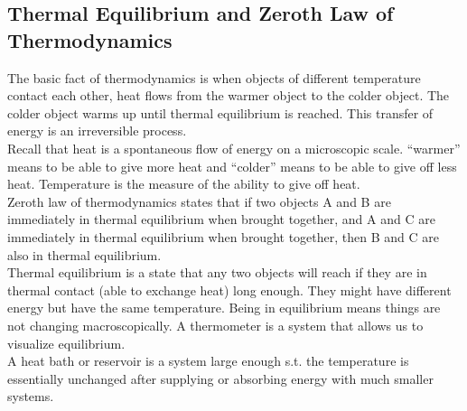 \subsection{Thermal Equilibrium and Zeroth Law of Thermodynamics}

The basic fact of thermodynamics is when objects of different temperature contact each other, heat flows from the warmer object to the colder object. The colder object warms up until thermal equilibrium is reached. This transfer of energy is an irreversible process. \\

Recall that heat is a spontaneous flow of energy on a microscopic scale. ``warmer'' means to be able to give more heat and ``colder'' means to be able to give off less heat. Temperature is the measure of the ability to give off heat. \\

Zeroth law of thermodynamics states that if two objects A and B are immediately in thermal equilibrium when brought together, and A and C are immediately in thermal equilibrium when brought together, then B and C are also in thermal equilibrium. \\

Thermal equilibrium is a state that any two objects will reach if they are in thermal contact (able to exchange heat) long enough. They might have different energy but have the same temperature. Being in equilibrium means things are not changing macroscopically. A thermometer is a system that allows us to visualize equilibrium. \\

A heat bath or reservoir is a system large enough s.t. the temperature is essentially unchanged after supplying or absorbing energy with much smaller systems. \\

